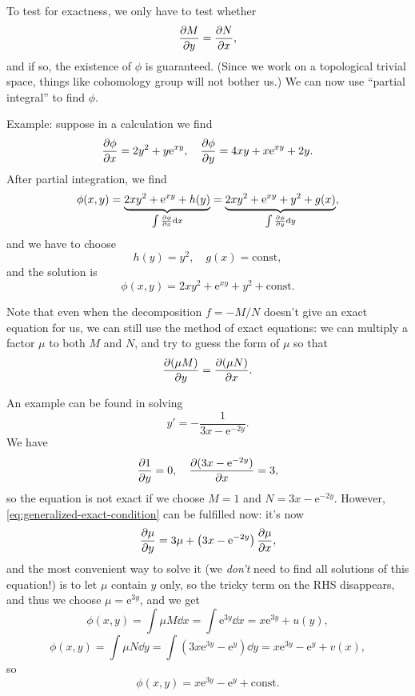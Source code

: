 \documentclass[hyperref, a4paper]{article}
\newcommand*{\ee}{\mathrm{e}}
\newcommand*{\const}{\mathrm{const}}
\begin{document}
To test for exactness, we only have to test whether
\begin{equation}
    \pdv{M}{y} = \pdv{N}{x},
\end{equation}
and if so, the existence of $\phi$ is guaranteed.
(Since we work on a topological trivial space, 
things like cohomology group will not bother us.)
We can now use ``partial integral'' to find $\phi$.

Example: suppose in a calculation we find  
\begin{equation}
    \pdv{\phi}{x} = 2 y^2 + y \ee^{xy}, \quad 
    \pdv{\phi}{y} = 4xy + x \ee^{xy} + 2y.
\end{equation}
After partial integration, we find 
\begin{equation}
    \phi(x, y) = \underbrace{2 xy^2 + \ee^{xy} + h(y)}_{
        \int \pdv{\phi}{x} \dd{x}
    }
    = \underbrace{2 xy^2 + \ee^{xy} + y^2 + g(x)}_{
        \int \pdv{\phi}{y} \dd{y}
    },
\end{equation}
and we have to choose 
\begin{equation}
    h(y) = y^2, \quad g(x) = \const,
\end{equation}
and the solution is 
\begin{equation}
    \phi(x, y) = 2 xy^2 + \ee^{xy} + y^2 + \const.
\end{equation}

Note that even when the decomposition $f = - M / N$
doesn't give an exact equation for us, 
we can still use the method of exact equations:
we can multiply a factor $\mu$ to both $M$ and $N$,
and try to guess the form of $\mu$ so that 
\begin{equation}
    \pdv{(\mu M)}{y} = 
    \pdv{(\mu N)}{x}.
    \label{eq:generalized-exact-condition}
\end{equation}

An example can be found in solving 
\begin{equation}
    y' = - \frac{1}{3x - \ee^{-2y}}.
\end{equation}
We have 
\[
    \pdv{1}{y} = 0, \quad 
    \pdv{(3x- \ee^{-2y})}{x} = 3,
\]
so the equation is not exact if we choose $M = 1$ and 
$N = 3x - \ee^{-2y}$.
However, \eqref{eq:generalized-exact-condition} 
can be fulfilled now: 
it's now 
\[
    \pdv{\mu}{y} = 3 \mu + \left(
        3x - \ee^{-2y}
    \right) \pdv{\mu}{x},
\]
and the most convenient way to solve it 
(we \emph{don't} need to find all solutions of this equation!)
is to let $\mu$ contain $y$ only,
so the tricky term on the RHS disappears,
and thus we choose $\mu = \ee^{3y}$,
and we get 
\[
    \phi(x, y) = \int \mu M \dd{x} 
    = \int \ee^{3y} \dd{x} = x \ee^{3y} + u(y),
\]
\[
    \phi(x, y) = \int \mu N \dd{y}
    = \int (3x \ee^{3y} - \ee^{y} ) \dd{y} 
    = x \ee^{3y} - \ee^{y} + v(x),
\]
so 
\begin{equation}
    \phi(x, y) = x \ee^{3y} - \ee^{y} + \const.
\end{equation}
\end{document}
